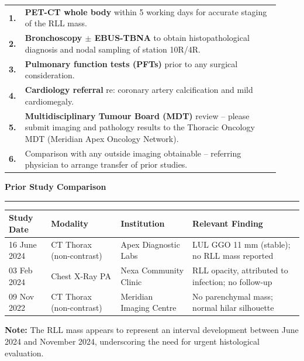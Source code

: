 \documentclass[11pt,a4paper]{article}
\newcommand{\subsectionrule}{%
  \vspace{1pt}%
  {\color{RadRule}\rule{\linewidth}{0.5pt}}%
  \vspace{3pt}%
}
\begin{document}
\begin{tcolorbox}[radbox, title={\faList\hspace{4pt}Recommended Next Steps}]
\vspace{4pt}
\small
\begin{tabular}{@{}p{0.04\linewidth}p{0.88\linewidth}@{}}
  \textbf{1.} & \textbf{PET-CT whole body} within 5 working days for accurate staging of the RLL mass. \\[4pt]
  \textbf{2.} & \textbf{Bronchoscopy $\pm$ EBUS-TBNA} to obtain histopathological diagnosis and nodal sampling of station 10R/4R. \\[4pt]
  \textbf{3.} & \textbf{Pulmonary function tests (PFTs)} prior to any surgical consideration. \\[4pt]
  \textbf{4.} & \textbf{Cardiology referral} re: coronary artery calcification and mild cardiomegaly. \\[4pt]
  \textbf{5.} & \textbf{Multidisciplinary Tumour Board (MDT)} review -- please submit imaging and pathology results to the Thoracic Oncology MDT (Meridian Apex Oncology Network). \\[4pt]
  \textbf{6.} & Comparison with any outside imaging obtainable -- referring physician to arrange transfer of prior studies. \\
\end{tabular}
\vspace{4pt}
\end{tcolorbox}

\vspace{8pt}


\begin{tcolorbox}[slatebox]
\noindent\textbf{\color{RadBlue}\faHistory\hspace{4pt}Prior Study Comparison}
\vspace{4pt}

\subsectionrule{}

\small
\begin{tabular}{@{}llll@{}}
  \toprule
  \textbf{Study Date} & \textbf{Modality} & \textbf{Institution} & \textbf{Relevant Finding} \\
  \midrule{}
  16 June 2024 & CT Thorax (non-contrast) & Apex Diagnostic Labs & LUL GGO 11 mm (stable); no RLL mass reported \\
  \rowcolor{RadBg}
  03 Feb 2024 & Chest X-Ray PA & Nexa Community Clinic & RLL opacity, attributed to infection; no follow-up \\
  09 Nov 2022 & CT Thorax (non-contrast) & Meridian Imaging Centre & No parenchymal mass; normal hilar silhouette \\
  \bottomrule
\end{tabular}

\vspace{6pt}
\noindent{\color{RadAmber}\faExclamationTriangle}\hspace{4pt}\small\textbf{Note:} The RLL mass appears to represent an interval development between June 2024 and November 2024, underscoring the need for urgent histological evaluation.
\end{tcolorbox}
\end{document}
